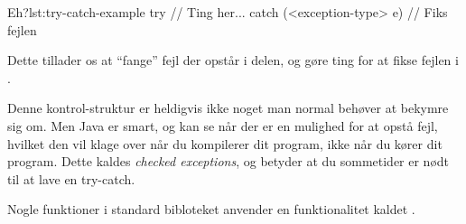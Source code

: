 	\begin{JavaCode}{Eh?}{lst:try-catch-example}
		try {
			// Ting her...
		} catch (<exception-type> e) {
			// Fiks fejlen
		}
	\end{JavaCode}

	Dette tillader os at ``fange'' fejl der opstår i 
	delen, og gøre ting for at fikse fejlen i .

	Denne kontrol-struktur er heldigvis ikke noget man normal behøver at bekymre
	sig om. Men Java er smart, og kan se når der er en mulighed for at opstå
	fejl, hvilket den vil klage over når du kompilerer dit program, ikke når du
	kører dit program. Dette kaldes \emph{checked exceptions}, og betyder at du
	sommetider er nødt til at lave en try-catch.


	Nogle funktioner i standard bibloteket anvender en funktionalitet kaldet
	.
